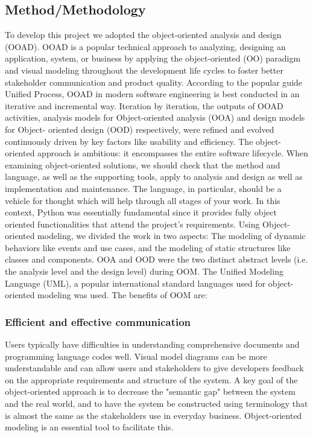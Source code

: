 \documentclass{acm_proc_article-sp}
\begin{document}
\subsection{Method/Methodology}
To develop this project we adopted the object-oriented analysis and design (OOAD). OOAD is a popular technical approach to analyzing, designing an application, system, or business by applying the object-oriented (OO) paradigm and visual modeling throughout the development life cycles to foster better stakeholder communication and product quality.
\newline
\newline
According to the popular guide Unified Process, OOAD in modern software engineering is best conducted in an iterative and incremental way. Iteration by iteration, the outputs of OOAD activities, analysis models for Object-oriented analysis (OOA) and design models for Object- oriented design (OOD) respectively, were refined and evolved continuously driven by key factors like usability and efficiency.
\newline
\newline
The object-oriented approach is ambitious: it encompasses the entire software lifecycle. When examining object-oriented solutions, we should check that the method and language, as well as the supporting tools, apply to analysis and design as well as implementation and maintenance. The language, in particular, should be a vehicle for thought which will help through all stages of your work. In this context, Python was essentially fundamental since it provides fully object oriented functionalities that attend the project's requirements. 
\newline
\newline
Using Object-oriented modeling, we divided the work in two aspects: The modeling of dynamic behaviors like events and use cases, and the modeling of static structures like classes and components. OOA and OOD were the two distinct abstract levels (i.e. the analysis level and the design level) during OOM. The Unified Modeling Language (UML), a popular international standard languages used for object-oriented modeling was used. The benefits of OOM are:

\subsubsection{Efficient and effective communication}

Users typically have difficulties in understanding comprehensive documents and programming language codes well. Visual model diagrams can be more understandable and can allow users and stakeholders to give developers feedback on the appropriate requirements and structure of the system. A key goal of the object-oriented approach is to decrease the "semantic gap" between the system and the real world, and to have the system be constructed using terminology that is almost the same as the stakeholders use in everyday business. Object-oriented modeling is an essential tool to facilitate this.
\end{document}
